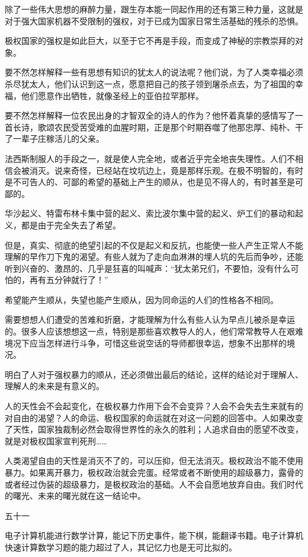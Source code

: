 除了一些伟大思想的麻醉力量，跟生存本能一同起作用的还有第三种力量，这就是对于强大国家机器不受限制的强权，对于已成为国家日常生活基础的残杀的恐惧。

极权国家的强权是如此巨大，以至于它不再是手段，而变成了神秘的宗教崇拜的对象。

要不然怎样解释一些有思想有知识的犹太人的说法呢？他们说，为了人类幸福必须杀尽犹太人，他们认识到这一点，愿意把自己的孩子领到屠杀点去，为了祖国的幸福，他们愿意作出牺牲，就像圣经上的亚伯拉罕那样。

要不然怎样解释一位农民出身的才智双全的诗人的作为？他怀着真挚的感情写了一首长诗，歌颂农民受苦受难的血腥时期，正是那个时期吞噬了他那忠厚、纯朴、干了一辈子庄稼活儿的父亲。

法西斯制服人的手段之一，就是使人完全地，或者近乎完全地丧失理性。人们不相信会被消灭。说来奇怪，已经站在坟坑边上，竟是那样乐观。在极不明智的，有时是不可告人的、可鄙的希望的基础上产生的顺从，也是见不得人的，有时甚至是可鄙的。

华沙起义、特雷布林卡集中营的起义、索比波尔集中营的起义、炉工们的暴动和起义，都是由于完全失去了希望。

但是，真实、彻底的绝望引起的不仅是起义和反抗，也能使一些人产生正常人不能理解的早作刀下鬼的渴望。有些人就为了走向血淋淋的埋人坑的先后而争吵，还能听到兴奋的、激昂的、几乎是狂喜的叫喊声：“犹太弟兄们，不要怕，没有什么可怕的，再有五分钟就行了！”

希望能产生顺从，失望也能产生顺从，因为同命运的人们的性格各不相同。

需要想想人们遭受的苦难和折磨，才能理解为什么有些人认为早点儿被杀是幸运的。很多人应该想想这一点，特别是那些喜欢教导人的人，他们常常教导人在艰难境况下应当怎样进行斗争，可惜这些说空话的导师都很幸运，想象不出那样的境况。

明白了人对于强权暴力的顺从，还必须做出最后的结论，这样的结论对于理解人、理解人的未来是有意义的。

人的天性会不会起变化，在极权暴力作用下会不会变异？人会不会失去生来就有的对自由的渴望？人的命运、极权国家的命运就在对这一问题的回答中。人如果改变了天性，国家独裁制必然会取得世界性的永久的胜利；人追求自由的愿望不改变，就是对极权国家宣判死刑……

人类渴望自由的天性是消灭不了的，可以压抑，但无法消灭。极权政治不能不使用暴力。如果离开暴力，极权政治就会完蛋。经常或者不断使用的超级暴力，露骨的或者经过伪装的超级暴力，是极权政治的基础。人不会自愿地放弃自由。我们时代的曙光、未来的曙光就在这一结论中。

五十一

电子计算机能进行数学计算，能记下历史事件，能下棋，能翻译书籍。电子计算机快速计算数学习题的能力超过了人，其记忆力也是无可比拟的。

